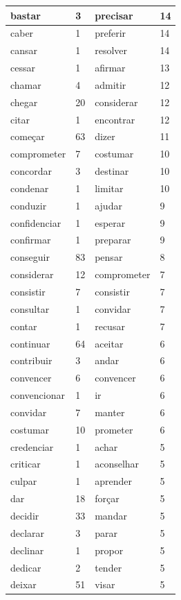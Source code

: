\documentclass[output=paper,colorlinks,citecolor=brown]{langscibook}
\begin{document}
\begin{longtable}{ p{3cm} | p{1cm} | p{3cm} | p{1cm} }
		bastar & 3 & precisar & 14\\\hline
		caber & 1 & preferir & 14\\\hline
		cansar & 1 & resolver & 14\\\hline
		cessar & 1 & afirmar & 13\\\hline
		chamar & 4 & admitir & 12\\\hline
		chegar & 20 & considerar & 12\\\hline
		citar & 1 & encontrar & 12\\\hline
		começar & 63 & dizer & 11\\\hline
		comprometer & 7 & costumar & 10\\\hline
		concordar & 3 & destinar & 10\\\hline
		condenar & 1 & limitar & 10\\\hline
		conduzir & 1 & ajudar & 9\\\hline
		confidenciar & 1 & esperar & 9\\\hline
		confirmar & 1 & preparar & 9\\\hline
		conseguir & 83 & pensar & 8\\\hline
		considerar & 12 & comprometer & 7\\\hline
		consistir & 7 & consistir & 7\\\hline
		consultar & 1 & convidar & 7\\\hline
		contar & 1 & recusar & 7\\\hline
		continuar & 64 & aceitar & 6\\\hline
		contribuir & 3 & andar & 6\\\hline
		convencer & 6 & convencer & 6\\\hline
		convencionar & 1 & ir & 6\\\hline
		convidar & 7 & manter & 6\\\hline
		costumar & 10 & prometer & 6\\\hline
		credenciar & 1 & achar & 5\\\hline
		criticar & 1 & aconselhar & 5\\\hline
		culpar & 1 & aprender & 5\\\hline
		dar & 18 & forçar & 5\\\hline
		decidir & 33 & mandar & 5\\\hline
		declarar & 3 & parar & 5\\\hline
		declinar & 1 & propor & 5\\\hline
		dedicar & 2 & tender & 5\\\hline
		deixar & 51 & visar & 5\\\hline

\end{longtable}
\end{document}
